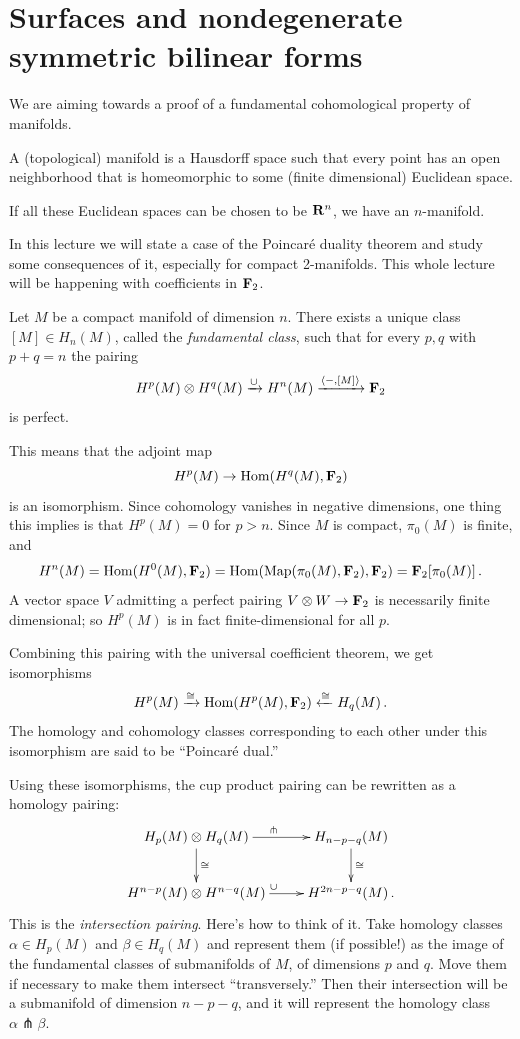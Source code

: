 \section{Surfaces and nondegenerate symmetric bilinear forms}

We are aiming towards a proof of a fundamental cohomological property of
manifolds. 

\begin{definition} A (topological) manifold is a Hausdorff space such that
every point has an open neighborhood that is homeomorphic to some (finite
dimensional) Euclidean space. 
\end{definition}

If all these Euclidean spaces can be chosen to be $\mathbf R^n$, we have an 
$n$-manifold. 

In this lecture we will state a case of the Poincar\'e duality theorem
and study some consequences of it, especially for compact 2-manifolds. 
This whole lecture will be happening with coefficients in $\mathbf F_2$. 

\begin{theorem}
Let $M$ be a compact manifold of dimension $n$.  
There exists a unique class $[M]\in H_n(M)$, called the {\em fundamental class}, such that for every $p,q$ with $p+q=n$ the pairing 
\[
H^p(M)\otimes H^q(M)\xrightarrow{\cup} H^n(M)\xrightarrow{\langle -,[M]\rangle}\mathbf F_2
\]
is perfect. 
\end{theorem}
This means that the adjoint map
\[
H^p(M)\to\operatorname{Hom}(H^q(M),\mathbf F_2)
\]
is an isomorphism. Since cohomology vanishes in negative dimensions, one thing
this implies is that $H^p(M)=0$ for $p>n$. Since $M$ is compact, $\pi_0(M)$
is finite, and 
\[
H^n(M)=\operatorname{Hom}(H^0(M),\mathbf F_2)=\operatorname{Hom}(\operatorname{Map}(\pi_0(M),\mathbf F_2),\mathbf F_2)=\mathbf F_2[\pi_0(M)]\,.
\]
A vector space $V$ admitting a perfect pairing $V\otimes W\to\mathbf F_2$
is necessarily finite dimensional; so $H^p(M)$ is in fact finite-dimensional 
for all $p$.

Combining this pairing with the universal coefficient theorem, we get 
isomorphisms
\[
H^p(M)\xrightarrow{\cong}\operatorname{Hom}(H^p(M),\mathbf F_2)\xleftarrow{\cong}H_q(M)\,.
\]
The homology and cohomology classes corresponding to each other under this 
isomorphism are said to be ``Poincar\'e dual.'' 

Using these isomorphisms, the cup product pairing can be rewritten as a
homology pairing:
\[
\xymatrix{
H_p(M)\otimes H_q(M) \ar[r]^\pitchfork \ar[d]^\cong & 
H_{n-p-q}(M) \ar[d]^\cong \\
H^{n-p}(M)\otimes H^{n-q}(M) \ar[r]^\cup & H^{2n-p-q}(M)\,.
}\]
This is the {\em intersection pairing}. Here's how to think of it. 
Take homology classes $\alpha\in H_p(M)$ and $\beta\in H_q(M)$ and
represent them (if possible!) as the image of the fundamental classes
of submanifolds of $M$, of dimensions $p$ and $q$. 
Move them if necessary to make them intersect ``transversely.''
Then their intersection will be a submanifold of dimension
$n-p-q$, and it will represent the homology class $\alpha\pitchfork\beta$.

